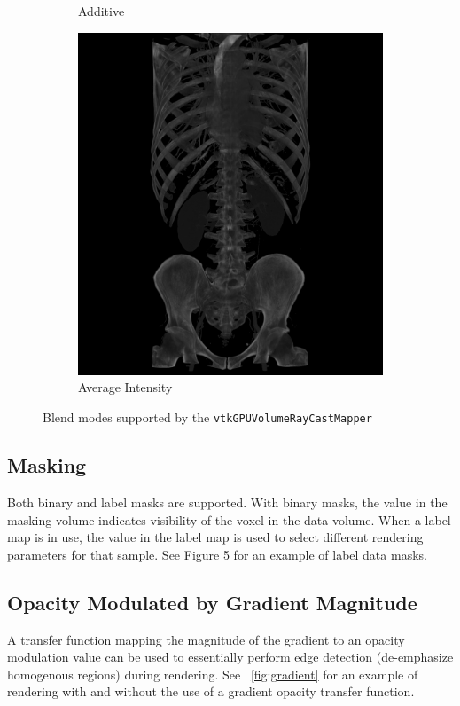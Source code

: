 \begin{figure}[htb]
\begin{subfigure}{.5\columnwidth}
    \caption{Additive}
    \label{fig:blendadditive}
  \end{subfigure}%
  \begin{subfigure}{.5\columnwidth}
    \includegraphics[width=\columnwidth]{TorsoBlendingAverage.png}
    \caption{Average Intensity}
    \label{fig:blendaverage}
  \end{subfigure}
  \caption{Blend modes supported by the \texttt{vtkGPUVolumeRayCastMapper}}
  \label{fig:blendingmodes}
\end{figure}

\subsection{Masking}
\label{masking}
Both binary and label masks are supported. With binary masks, the value in the
masking volume indicates visibility of the voxel in the data volume. When a
label map is in use, the value in the label map is used to select different
rendering parameters for that sample.  See Figure 5 for an example of label data
masks.

\subsection{Opacity Modulated by Gradient Magnitude}
\label{opacity-modulated-by-gradient-magnitude}
A transfer function mapping the magnitude of the gradient to an opacity
modulation value can be used to essentially perform edge detection (de-emphasize
homogenous regions) during rendering. See ~\autoref{fig:gradient} for an example
of rendering with and without the use of a gradient opacity transfer function.

